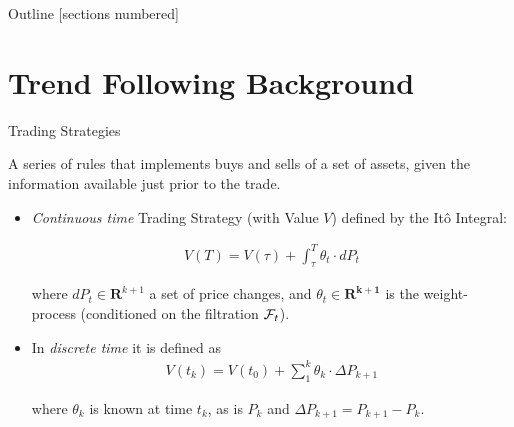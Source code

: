 

\begin{frame}{Outline}
    [sections numbered]
    \tableofcontents
\end{frame}





\section{Trend Following Background}
\begin{frame}{Trading Strategies}
    \begin{definition}
        A series of rules that implements buys and sells of a set of assets, given the  information available just prior to the trade.
    \end{definition}
    
    \pause
    \begin{itemize}
    \item 
    {\sl Continuous time} Trading Strategy (with Value $V$) defined by the It\^o Integral:
    
        \begin{align*}
        V(T) = V(\tau) + \int_\tau^T \theta_t\cdot dP_t
        \end{align*} 
        
    where $dP_t\in\mathbf{R}^{k+1}$ a set of price changes, and $\theta_t\in \mathbf{R^{k+1}}$ is the weight-process (conditioned on the filtration 
    ${\cal F}_t$). 
    \pause
    \item 
    In  {\sl discrete time} it is defined as 
    \begin{align*}
        V(t_k) = V(t_0) + \sum_1^k \theta_k\cdot \Delta P_{k+1}
        \end{align*} 
        
    where $\theta_k$ is known at time $t_k$, as is $P_k$ and $\Delta P_{k+1} = P_{k+1} - P_k$. 
    \pause
    \end{itemize}
\end{frame}



